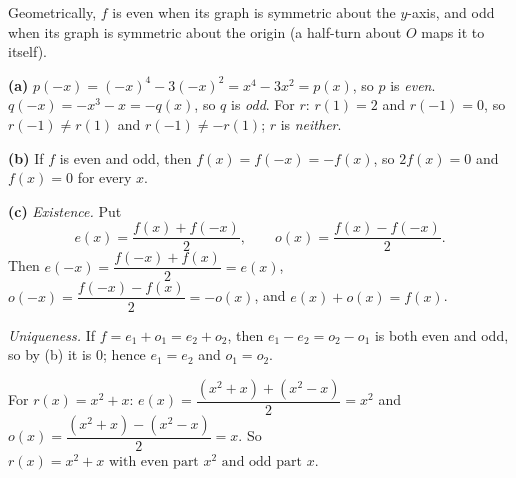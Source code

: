 Geometrically, $f$ is even when its graph is symmetric about the $y$-axis, and odd when its graph is symmetric about the origin (a half-turn about $O$ maps it to itself).

\textbf{(a)} $p(-x)=(-x)^4-3(-x)^2=x^4-3x^2=p(x)$, so $p$ is \emph{even}. $q(-x)=-x^3-x=-q(x)$, so $q$ is \emph{odd}. For $r$: $r(1)=2$ and $r(-1)=0$, so $r(-1)\ne r(1)$ and $r(-1)\ne-r(1)$; $r$ is \emph{neither}.

\textbf{(b)} If $f$ is even and odd, then $f(x)=f(-x)=-f(x)$, so $2f(x)=0$ and $f(x)=0$ for every $x$.

\textbf{(c)} \emph{Existence.} Put
\[
e(x)=\dfrac{f(x)+f(-x)}{2},\qquad o(x)=\dfrac{f(x)-f(-x)}{2}.
\]
Then $e(-x)=\dfrac{f(-x)+f(x)}{2}=e(x)$, $o(-x)=\dfrac{f(-x)-f(x)}{2}=-o(x)$, and $e(x)+o(x)=f(x)$.

\emph{Uniqueness.} If $f=e_1+o_1=e_2+o_2$, then $e_1-e_2=o_2-o_1$ is both even and odd, so by (b) it is $0$; hence $e_1=e_2$ and $o_1=o_2$.

For $r(x)=x^2+x$: $e(x)=\dfrac{(x^2+x)+(x^2-x)}{2}=x^2$ and $o(x)=\dfrac{(x^2+x)-(x^2-x)}{2}=x$. So $\boxed{r(x)=x^2+x\text{ with even part }x^2\text{ and odd part }x}$.
